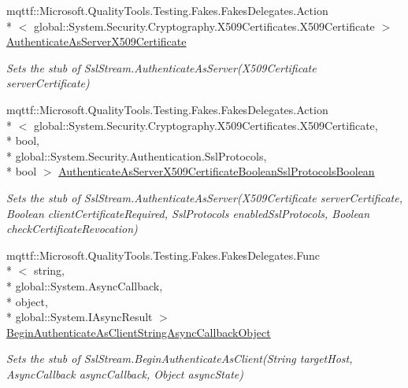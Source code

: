 \begin{DoxyCompactItemize}
mqttf\-::\-Microsoft.\-Quality\-Tools.\-Testing.\-Fakes.\-Fakes\-Delegates.\-Action\\*
$<$ global\-::\-System.\-Security.\-Cryptography.\-X509\-Certificates.\-X509\-Certificate $>$ \hyperlink{class_system_1_1_net_1_1_security_1_1_fakes_1_1_stub_ssl_stream_a954975550e4f92471da2d35783124ead}{Authenticate\-As\-Server\-X509\-Certificate}
\begin{DoxyCompactList}\small\item\em Sets the stub of Ssl\-Stream.\-Authenticate\-As\-Server(\-X509\-Certificate server\-Certificate)\end{DoxyCompactList}\item 
mqttf\-::\-Microsoft.\-Quality\-Tools.\-Testing.\-Fakes.\-Fakes\-Delegates.\-Action\\*
$<$ global\-::\-System.\-Security.\-Cryptography.\-X509\-Certificates.\-X509\-Certificate, \\*
bool, \\*
global\-::\-System.\-Security.\-Authentication.\-Ssl\-Protocols, \\*
bool $>$ \hyperlink{class_system_1_1_net_1_1_security_1_1_fakes_1_1_stub_ssl_stream_ae60d86a67cd3c105612ba3f1c183343c}{Authenticate\-As\-Server\-X509\-Certificate\-Boolean\-Ssl\-Protocols\-Boolean}
\begin{DoxyCompactList}\small\item\em Sets the stub of Ssl\-Stream.\-Authenticate\-As\-Server(\-X509\-Certificate server\-Certificate, Boolean client\-Certificate\-Required, Ssl\-Protocols enabled\-Ssl\-Protocols, Boolean check\-Certificate\-Revocation)\end{DoxyCompactList}\item 
mqttf\-::\-Microsoft.\-Quality\-Tools.\-Testing.\-Fakes.\-Fakes\-Delegates.\-Func\\*
$<$ string, \\*
global\-::\-System.\-Async\-Callback, \\*
object, \\*
global\-::\-System.\-I\-Async\-Result $>$ \hyperlink{class_system_1_1_net_1_1_security_1_1_fakes_1_1_stub_ssl_stream_af1381c2a8cd701f74566e0631b9a04c4}{Begin\-Authenticate\-As\-Client\-String\-Async\-Callback\-Object}
\begin{DoxyCompactList}\small\item\em Sets the stub of Ssl\-Stream.\-Begin\-Authenticate\-As\-Client(\-String target\-Host, Async\-Callback async\-Callback, Object async\-State)\end{DoxyCompactList}\item 

\end{DoxyCompactItemize}
